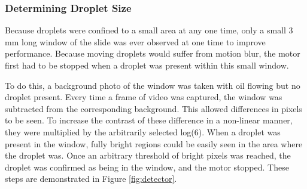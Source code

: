 \documentclass{physics_article_B}
\begin{document}
        \subsubsection{Determining Droplet Size\label{sect:method:vision:size}}
                
                Because droplets were confined to a small area at any one time, only a small 3 mm long window of the slide was ever observed at one time to improve performance. Because moving droplets would suffer from motion blur, the motor first had to be stopped when a droplet was present within this small window. 
                
                To do this, a background photo of the window was  taken with oil flowing but no droplet present. Every time a frame of video was captured, the window was subtracted from the corresponding background. This allowed differences in pixels to be seen. To increase the contrast of these difference in a non-linear manner, they were multiplied by the arbitrarily selected log(6). When a droplet was present in the window, fully bright regions could be easily seen in the area where the droplet was. Once an arbitrary threshold of bright pixels was reached, the droplet was confirmed as being in the window, and the motor stopped. These steps are demonstrated in Figure \ref{fig:detector}.
            
\end{document}
